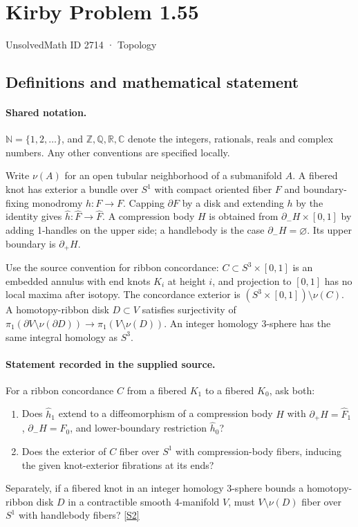 \documentclass[11pt]{article}
\newcommand{\sref}[2]{\hyperlink{source:#1:#2}{[S#2]}}
\begin{document}
\setcounter{section}{2713}
\section{Kirby Problem 1.55}\label{2714}
{\small\sffamily UnsolvedMath ID 2714 · Topology}
\subsection{Definitions and mathematical statement}

\paragraph{Shared notation.}$\mathbb N=\{1,2,\ldots\}$, and $\mathbb Z,\mathbb Q,\mathbb R,\mathbb C$ denote the integers, rationals, reals and complex numbers. Any other conventions are specified locally.


Write $\nu(A)$ for an open tubular neighborhood of a submanifold $A$. A fibered knot has exterior a bundle over $S^1$ with compact oriented fiber $F$ and boundary-fixing monodromy $h:F\to F$. Capping $\partial F$ by a disk and extending $h$ by the identity gives $\widehat h:\widehat F\to\widehat F$. A compression body $H$ is obtained from $\partial_-H\times[0,1]$ by adding 1-handles on the upper side; a handlebody is the case $\partial_-H=\varnothing$. Its upper boundary is $\partial_+H$.

Use the source convention for ribbon concordance: $C\subset S^3\times[0,1]$ is an embedded annulus with end knots $K_i$ at height $i$, and projection to $[0,1]$ has no local maxima after isotopy. The concordance exterior is $(S^3\times[0,1])\setminus\nu(C)$. A homotopy-ribbon disk $D\subset V$ satisfies surjectivity of $\pi_1(\partial V\setminus\nu(\partial D))\to\pi_1(V\setminus\nu(D))$. An integer homology 3-sphere has the same integral homology as $S^3$.
\paragraph{Statement recorded in the supplied source.}
For a ribbon concordance $C$ from a fibered $K_1$ to a fibered $K_0$, ask both:
\begin{enumerate}
\item Does $\widehat h_1$ extend to a diffeomorphism of a compression body $H$ with $\partial_+H=\widehat F_1$, $\partial_-H=\widehat F_0$, and lower-boundary restriction $\widehat h_0$?
\item Does the exterior of $C$ fiber over $S^1$ with compression-body fibers, inducing the given knot-exterior fibrations at its ends?
\end{enumerate}
Separately, if a fibered knot in an integer homology 3-sphere bounds a homotopy-ribbon disk $D$ in a contractible smooth 4-manifold $V$, must $V\setminus\nu(D)$ fiber over $S^1$ with handlebody fibers? \sref{2714}{2}
\end{document}
